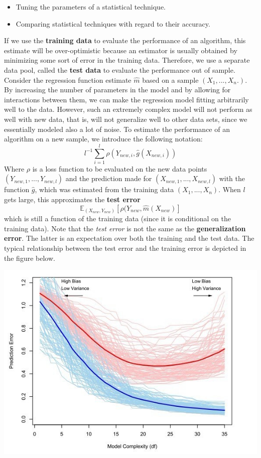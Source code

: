 \documentclass[]{book}
\providecommand{\tightlist}{%
  \setlength{\itemsep}{0pt}\setlength{\parskip}{0pt}}
\begin{document}
\begin{itemize}
\tightlist
\item
  Tuning the parameters of a statistical technique.
\item
  Comparing statistical techniques with regard to their accuracy.
\end{itemize}

If we use the \textbf{training data} to evaluate the performance of an
algorithm, this estimate will be over-optimistic because an estimator is
usually obtained by minimizing some sort of error in the training data.
Therefore, we use a separate data pool, called the \textbf{test data} to
evaluate the performance out of sample. Consider the regression function
estimate \(\hat{m}\) based on a sample \((X_1, ..., X_n.)\). By
increasing the number of parameters in the model and by allowing for
interactions between them, we can make the regression model fitting
arbitrarily well to the data. However, such an extremely complex model
will not perform as well with new data, that is, will not generalize
well to other data sets, since we essentially modeled also a lot of
noise. To estimate the performance of an algorithm on a new sample, we
introduce the following notation:
\[ l^{-1}\sum\limits_{i = 1}^l\rho(Y_{new, i}, \hat{g}(X_{new, i}))\]
Where \(\rho\) is a loss function to be evaluated on the new data points
\((Y_{new, 1}, ..., Y_{new, l})\) and the prediction made for
\((X_{new, 1}, ..., X_{new, l})\) with the function \(\hat{g}\), which
was estimated from the training data \((X_1, ..., X_n)\). When \(l\)
gets large, this approximates the \textbf{test error}
\[\mathbb{E}_{(X_{new}, Y_{new})}[\rho(Y_{new}, \hat{m}(X_{new})]\]
which is still a function of the training data (since it is conditional
on the training data). Note that the \emph{test error} is not the same
as the \textbf{generalization error}. The latter is an expectation over
both the training and the test data. The typical relationship between
the test error and the training error is depicted in the figure below.

\includegraphics[width=650px]{figures/ge}
\end{document}
